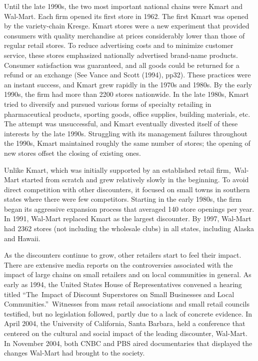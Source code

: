 \documentclass[notitlepage,onecolumn,11pt]{article}
\begin{document}
Until the late 1990s, the two most important national chains were Kmart and
Wal-Mart. Each firm opened its first store in 1962. The first Kmart was
opened by the variety-chain Kresge. Kmart stores were a new experiment that
provided consumers with quality merchandise at prices considerably lower
than those of regular retail stores. To reduce advertising costs and to
minimize customer service, these stores emphasized nationally advertised
brand-name products. Consumer satisfaction was guaranteed, and all goods
could be returned for a refund or an exchange (See Vance and Scott (1994),
pp32). These practices were an instant success, and Kmart grew rapidly in
the 1970s and 1980s. By the early 1990s, the firm had more than 2200 stores
nationwide. In the late 1980s, Kmart tried to diversify and pursued various
forms of specialty retailing in pharmaceutical products, sporting goods,
office supplies, building materials, etc. The attempt was unsuccessful, and
Kmart eventually divested itself of these interests by the late 1990s.
Struggling with its management failures throughout the 1990s, Kmart
maintained roughly the same number of stores; the opening of new stores
offset the closing of existing ones.

Unlike Kmart, which was initially supported by an established retail firm,\
Wal-Mart started from scratch and grew relatively slowly in the beginning.
To avoid direct competition with other discounters, it focused on small
towns in southern states where there were few competitors. Starting in the
early 1980s, the firm began its aggressive expansion process that averaged
140 store openings per year. In 1991, Wal-Mart replaced Kmart as the largest
discounter. By 1997, Wal-Mart had 2362 stores (not including the wholesale
clubs) in all states, including Alaska and Hawaii.

As the discounters continue to grow, other retailers start to feel their
impact. There are extensive media reports on the controversies associated
with the impact of large chains on small retailers and on local communities
in general. As early as 1994, the United States House of Representatives
convened a hearing titled \textquotedblleft The\ Impact of Discount
Superstores on Small Businesses and Local Communities.\textquotedblright\
Witnesses from mass retail associations and small retail councils testified,
but no legislation followed, partly due to a lack of concrete evidence. In
April 2004, the University of California, Santa Barbara, held a conference
that centered on the cultural and social impact of the leading discounter,
Wal-Mart. In November 2004, both CNBC and PBS aired documentaries that
displayed the changes Wal-Mart had brought to the society.
\end{document}
